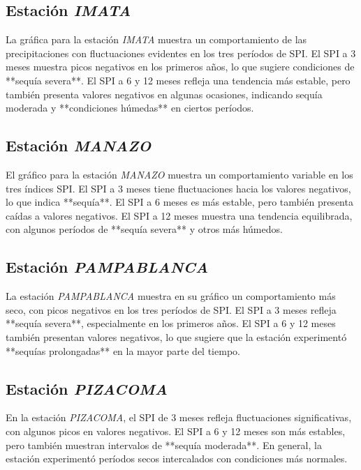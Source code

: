 \subsection*{Estación \textit{IMATA}}

La gráfica para la estación \textit{IMATA} muestra un comportamiento de las precipitaciones con fluctuaciones evidentes en los tres períodos de SPI. El SPI a 3 meses muestra picos negativos en los primeros años, lo que sugiere condiciones de **sequía severa**. El SPI a 6 y 12 meses refleja una tendencia más estable, pero también presenta valores negativos en algunas ocasiones, indicando sequía moderada y **condiciones húmedas** en ciertos períodos.

\subsection*{Estación \textit{MANAZO}}

El gráfico para la estación \textit{MANAZO} muestra un comportamiento variable en los tres índices SPI. El SPI a 3 meses tiene fluctuaciones hacia los valores negativos, lo que indica **sequía**. El SPI a 6 meses es más estable, pero también presenta caídas a valores negativos. El SPI a 12 meses muestra una tendencia equilibrada, con algunos períodos de **sequía severa** y otros más húmedos.

\subsection*{Estación \textit{PAMPABLANCA}}

La estación \textit{PAMPABLANCA} muestra en su gráfico un comportamiento más seco, con picos negativos en los tres períodos de SPI. El SPI a 3 meses refleja **sequía severa**, especialmente en los primeros años. El SPI a 6 y 12 meses también presentan valores negativos, lo que sugiere que la estación experimentó **sequías prolongadas** en la mayor parte del tiempo.

\subsection*{Estación \textit{PIZACOMA}}

En la estación \textit{PIZACOMA}, el SPI de 3 meses refleja fluctuaciones significativas, con algunos picos en valores negativos. El SPI a 6 y 12 meses son más estables, pero también muestran intervalos de **sequía moderada**. En general, la estación experimentó períodos secos intercalados con condiciones más normales.

